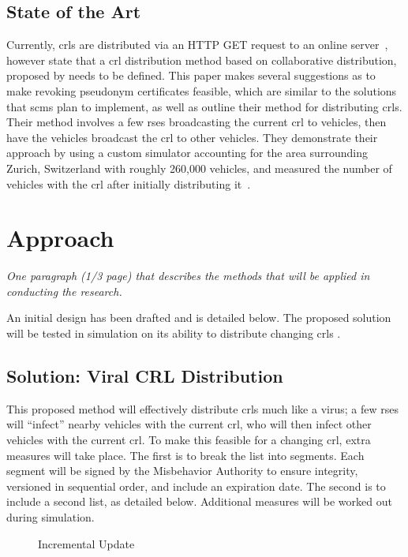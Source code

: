 \documentclass {article}
\newcommand{\sechint}[1]{\small{\emph{#1}} \bigskip}
\begin{document}
\subsection{State of the Art}
Currently, \gls{crl}s are distributed via an HTTP GET request to an online server~\autocite{brecht_scms_nodate}, however \autocite{brecht_security_2018} state that a \gls{crl} distribution method based on collaborative distribution, proposed by \autocite{haas_efficient_2011} needs to be defined. This paper makes several suggestions as to make revoking pseudonym certificates feasible, which are similar to the solutions that \gls{scms} plan to implement, as well as outline their method for distributing \gls{crl}s. Their method involves a few \gls{rse}s broadcasting the current \gls{crl} to vehicles, then have the vehicles broadcast the \gls{crl} to other vehicles. They demonstrate their approach by using a custom simulator accounting for the area surrounding Zurich, Switzerland with roughly 260,000 vehicles, and measured the number of vehicles with the \gls{crl} after initially distributing it~\autocite{haas_efficient_2011}.

\section{Approach}{\sechint{One paragraph (1/3 page) that describes the methods that will be applied in conducting the research.}}

An initial design has been drafted and is detailed below. The proposed solution will be tested in simulation on its ability to distribute changing \gls{crl}s .

\subsection{Solution: Viral CRL Distribution}
This proposed method will effectively distribute \gls{crl}s much like a virus; a few \gls{rse}s will ``infect'' nearby vehicles with the current \gls{crl}, who will then infect other vehicles with the current \gls{crl}. To make this feasible for a changing \gls{crl}, extra measures will take place. The first is to break the list into segments. Each segment will be signed by the Misbehavior Authority to ensure integrity, versioned in sequential order, and include an expiration date. The second is to include a second list, as detailed below. Additional measures will be worked out during simulation.

\begin{figure}[!ht]
	\centering
	
	\caption{Incremental Update}
	\label{fig:incr_update}
\end{figure}
\end{document}
